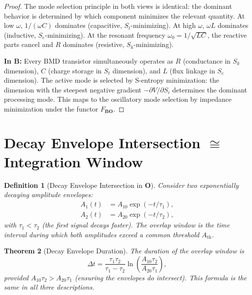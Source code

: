 \documentclass[twocolumn,10pt]{article}
\newtheorem{theorem}{Theorem}[section]
\newtheorem{definition}[theorem]{Definition}
\theoremstyle{remark}
\newcommand{\Sk}{S_k}
\newcommand{\St}{S_t}
\newcommand{\Se}{S_e}
\newcommand{\CatO}{\mathbf{O}}
\newcommand{\CatB}{\mathbf{B}}
\newcommand{\Fbo}{F_{\CatB\CatO}}
\begin{document}
\begin{proof}
The mode selection principle in both views is identical: the dominant behavior is determined by which component minimizes the relevant quantity.
At low $\omega$, $1/(\omega C)$ dominates (capacitive, $\St$-minimizing).
At high $\omega$, $\omega L$ dominates (inductive, $\Se$-minimizing).
At the resonant frequency $\omega_0 = 1/\sqrt{LC}$, the reactive parts cancel and $R$ dominates (resistive, $\Sk$-minimizing).

\textbf{In $\CatB$:}
Every BMD transistor simultaneously operates as $R$ (conductance in $\Sk$ dimension), $C$ (charge storage in $\St$ dimension), and $L$ (flux linkage in $\Se$ dimension).
The active mode is selected by S-entropy minimization: the dimension with the steepest negative gradient $-\partial V/\partial S_i$ determines the dominant processing mode.
This maps to the oscillatory mode selection by impedance minimization under the functor $\Fbo$.
\end{proof}

\section{\texorpdfstring{Decay Envelope Intersection $\cong$ Integration Window}{Decay Envelope Intersection = Integration Window}}
\label{sec:decay}

\begin{definition}[Decay Envelope Intersection in $\CatO$]
\label{def:decay_O}
Consider two exponentially decaying amplitude envelopes:
\begin{align}
A_1(t) &= A_{10}\exp(-t/\tau_1), \label{eq:decay1}\\
A_2(t) &= A_{20}\exp(-t/\tau_2), \label{eq:decay2}
\end{align}
with $\tau_1 < \tau_2$ (the first signal decays faster).
The \emph{overlap window} is the time interval during which both amplitudes exceed a common threshold $A_{\mathrm{th}}$.
\end{definition}

\begin{theorem}[Decay Envelope Duration]
\label{thm:decay_duration}
The duration of the overlap window is
\begin{equation}
\Delta t = \frac{\tau_1 \tau_2}{\tau_1 - \tau_2}\ln\!\left(\frac{A_{10}\tau_2}{A_{20}\tau_1}\right),
\label{eq:overlap_duration}
\end{equation}
provided $A_{10}\tau_2 > A_{20}\tau_1$ (ensuring the envelopes do intersect).
This formula is the same in all three descriptions.
\end{theorem}
\end{document}
